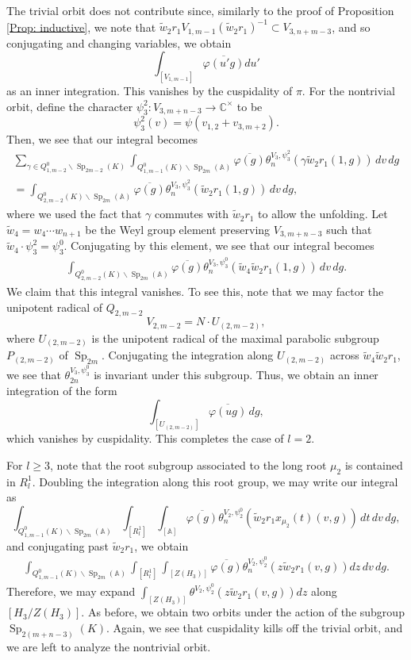 \documentclass[11pt,reqno]{amsart}
\theoremstyle{definition}
\theoremstyle{remark}
\theoremstyle{definition}
\begin{document}
The trivial orbit does not contribute since, similarly to the proof of Proposition \ref{Prop: inductive}, we note that $\tilde{w}_2r_1V_{1,m-1}(\tilde{w}_2r_1)^{-1}\subset V_{3,n+m-3}$, and so conjugating and changing variables, we obtain
\[
\int_{[V_{1,m-1}]}\overline{\varphi(u'g)}du'
\]
as an inner integration. This vanishes by the cuspidality of $\pi$. For the nontrivial orbit, define the character $\psi_3^2: V_{3,m+n-3}\to {\mathbb C}^\times$ to be 
\[
\psi_3^2(v) = \psi(v_{1,2}+v_{3,m+2}).
\]
Then, we see that our integral becomes
\begin{align*}
\sum_{{\gamma}\in Q^0_{1,m-2}\backslash \operatorname{Sp}_{2m-2}(K)} \int_{Q_{1,m-1}^0(K)\backslash\operatorname{Sp}_{2m}({\mathbb A})}\overline{\varphi(g)}\theta^{V_3,\psi_3^2}_{n}({\gamma}\tilde{w}_2 r_1(1,g))\,dv\,dg\\
= \int_{Q_{2,m-2}^0(K)\backslash\operatorname{Sp}_{2m}({\mathbb A})}\overline{\varphi(g)}\theta^{V_3,\psi_3^2}_{n}(\tilde{w}_2 r_1(1,g))\,dv\,dg,
\end{align*}
where we used the fact that ${\gamma}$ commutes with $\tilde{w}_2r_1$ to allow the unfolding.
 Let $\tilde{w}_4 = w_4\cdots w_{n+1}$ be the Weyl group element preserving $V_{3,m+n-3}$ such that $\tilde{w}_4\cdot\psi_3^2 = \psi_3^0$. Conjugating by this element, we see that our integral becomes
\begin{align}\label{eqn: even step 2}
\int_{Q_{2,m-2}^0(K)\backslash\operatorname{Sp}_{2m}({\mathbb A})}\overline{\varphi(g)}\theta^{V_3,\psi_3^0}_{n}(\tilde{w}_4\tilde{w}_2 r_1(1,g))\,dv\,dg.
\end{align}
We claim that this integral vanishes. To see this, note that we may factor the unipotent radical of $Q_{2,m-2}$ $$V_{2, m-2} = N\cdot U_{(2,m-2)},$$
where $U_{(2,m-2)}$ is the unipotent radical of the maximal parabolic subgroup $P_{(2,m-2)}$ of  $\operatorname{Sp}_{2m}$. Conjugating the integration along $U_{(2,m-2)}$ across $\tilde{w}_4\tilde{w}_2 r_1$, we see that $\theta_{2n}^{V_3,\psi_3^0}$ is invariant under this subgroup. Thus, we obtain an inner integration of the form 
\[
\int_{[U_{(2,m-2)}]}\overline{\varphi(ug)}\,dg,
\]
which vanishes by cuspidality. This completes the case of $l=2$.

For $l\geq 3$, note that the root subgroup associated to the long root $\mu_2$ is contained in $R_l^1$. Doubling the integration along this root group, we may write our integral as 
\[
\int_{Q_{1,m-1}^0(K)\backslash\operatorname{Sp}_{2m}({\mathbb A})}\int_{[R^1_l]}\int_{[{\mathbb A}]}\overline{\varphi(g)}\theta^{V_2,\psi_2^0}_{n}(\tilde{w}_2 r_1x_{\mu_2}(t)(v,g))\,dt\,dv\,dg,
\]
and conjugating past $\tilde{w}_2r_1$, we obtain
\begin{align}
\int_{Q_{1,m-1}^0(K)\backslash\operatorname{Sp}_{2m}({\mathbb A})}\int_{[R^1_l]}\int_{[Z(H_3)]}\overline{\varphi(g)}\theta^{V_2,\psi_2^0}_{n}(z\tilde{w}_2 r_1(v,g))dz\,dv\,dg.
\end{align}
Therefore, we may expand $\int_{[Z(H_3)]}\theta^{V_2,\psi_2^0}(z\tilde{w}_2 r_1(v,g))dz$ along $[H_3/Z(H_3)]$. 
As before, we obtain two orbits under the action of the subgroup $\operatorname{Sp}_{2(m+n-3)}(K)$. Again, we see that cuspidality kills off the trivial orbit, and we are left to analyze the nontrivial orbit.
\end{document}

